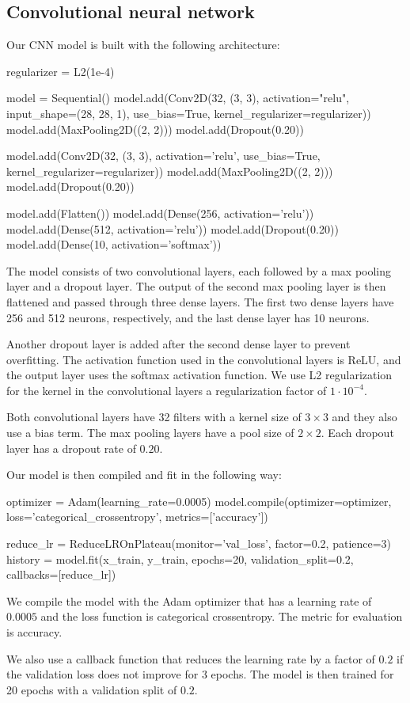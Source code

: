 \subsection{Convolutional neural network}

Our CNN model is built with the following architecture:

\begin{python}
regularizer = L2(1e-4)

model = Sequential()
model.add(Conv2D(32, (3, 3), activation="relu", input_shape=(28, 28, 1), use_bias=True, kernel_regularizer=regularizer))
model.add(MaxPooling2D((2, 2)))
model.add(Dropout(0.20))

model.add(Conv2D(32, (3, 3), activation='relu', use_bias=True, kernel_regularizer=regularizer))
model.add(MaxPooling2D((2, 2)))
model.add(Dropout(0.20))

model.add(Flatten())
model.add(Dense(256, activation='relu'))
model.add(Dense(512, activation='relu'))
model.add(Dropout(0.20))
model.add(Dense(10, activation='softmax'))
\end{python}

The model consists of two convolutional layers, each followed by a max pooling layer and a dropout layer. The output of the second max pooling layer is then flattened and passed through three dense layers. The first two dense layers have 256 and 512 neurons, respectively, and the last dense layer has 10 neurons. 
\par
Another dropout layer is added after the second dense layer to prevent overfitting. The activation function used in the convolutional layers is ReLU, and the output layer uses the softmax activation function. We use L2 regularization for the kernel in the convolutional layers a regularization factor of $1 \cdot 10^{-4}$.
\par
Both convolutional layers have 32 filters with a kernel size of $3 \times 3$ and they also use a bias term. The max pooling layers have a pool size of $2 \times 2$. Each dropout layer has a dropout rate of $0.20$.
\par
Our model is then compiled and fit in the following way:

\begin{python}
optimizer = Adam(learning_rate=0.0005)
model.compile(optimizer=optimizer, loss='categorical_crossentropy', metrics=['accuracy'])

reduce_lr = ReduceLROnPlateau(monitor='val_loss', factor=0.2, patience=3)
history = model.fit(x_train, y_train, epochs=20, validation_split=0.2, callbacks=[reduce_lr])
\end{python}

We compile the model with the Adam optimizer that has a learning rate of $0.0005$ and the loss function is categorical crossentropy. The metric for evaluation is accuracy.
\par
We also use a callback function that reduces the learning rate by a factor of $0.2$ if the validation loss does not improve for $3$ epochs. The model is then trained for 20 epochs with a validation split of $0.2$. 